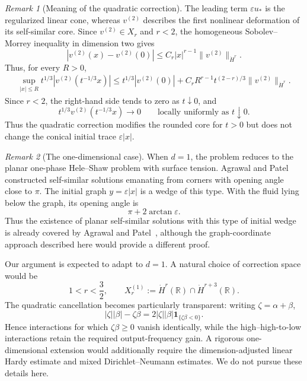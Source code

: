 \documentclass[12pt]{amsart}
\theoremstyle{remark}
\newtheorem{remark}{Remark}[section]
\theoremstyle{definition}
\numberwithin{equation}{section}
\newcommand{\R}{\mathbb{R}}
\begin{document}
\begin{remark}[Meaning of the quadratic correction]
The leading term \(\varepsilon u_*\) is the regularized linear cone, whereas \(v^{(2)}\) describes the first nonlinear deformation of its self-similar core.
Since \(v^{(2)}\in X_r\) and \(r<2\), the homogeneous
Sobolev--Morrey inequality in dimension two gives
\[
 |v^{(2)}(x)-v^{(2)}(0)|
 \leq
 C_r|x|^{r-1}\|v^{(2)}\|_{\dot H^r}.
\]
Thus, for every \(R>0\),
\begin{align*}
\sup_{|x|\leq R}
 t^{1/3}
 \left|
  v^{(2)}(t^{-1/3}x)
 \right|\leq
 t^{1/3}|v^{(2)}(0)|
 +
 C_rR^{r-1}
 t^{(2-r)/3}
 \|v^{(2)}\|_{\dot H^r}.
\end{align*}
Since \(r<2\), the right-hand side tends to zero as \(t\downarrow0\), and
\[
 t^{1/3}v^{(2)}(t^{-1/3}x)\longrightarrow0 \qquad\text{locally uniformly as }t\downarrow0.
\]
Thus the quadratic correction modifies the rounded core for \(t>0\) but does not change the conical initial trace \(\varepsilon|x|\).
\end{remark}

\begin{remark}[The one-dimensional case]
\label{rem:one-dimensional-case}
When \(d=1\), the problem reduces to the planar one-phase Hele--Shaw problem with surface tension. 
Agrawal and Patel~\cite{agrawal26} constructed self-similar solutions emanating from corners with opening angle close to \(\pi\).
The initial graph \(y=\varepsilon|x|\) is a wedge of this type. 
With the fluid lying below the graph, its opening angle is
\[
 \pi+2\arctan\varepsilon. 
\]
Thus the existence of planar self-similar solutions with this type
of initial wedge is already covered by Agrawal and
Patel~\cite{agrawal26}, although the graph-coordinate approach
described here would provide a different proof.

Our argument is expected to adapt to \(d=1\).  A natural choice of
correction space would be
\[
 1<r<\frac32,\qquad
 X_r^{(1)} := \dot H^r(\R)\cap\dot H^{r+3}(\R).
\]
The quadratic cancellation becomes particularly transparent: writing
\(\zeta=\alpha+\beta\),
\[
 |\zeta||\beta|-\zeta\beta = 2|\zeta||\beta|
 \mathbf 1_{\{\zeta\beta<0\}}.
\]
Hence interactions for which \(\zeta\beta\geq0\) vanish identically, while the high--high-to-low interactions retain the required output-frequency gain. A rigorous one-dimensional extension would additionally
require the dimension-adjusted linear Hardy estimate and mixed
Dirichlet--Neumann estimates.  We do not pursue these details here.
\end{remark}
\end{document}

